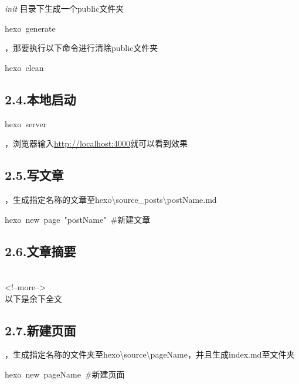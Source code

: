 \documentclass{article}
\begin{document}
 \emph{init} 目录下生成一个public文件夹%
\begin{mdpre}%
\noindent hexo~generate%
\end{mdpre}，那要执行以下命令进行清除public文件夹
\begin{mdpre}%
\noindent hexo~clean\\
\end{mdpre}
\subsection{2.4.\hspace*{0.5em}本地启动}\label{section}%
\begin{mdpre}%
\noindent hexo~server\\
\end{mdpre}，浏览器输入\href{http://localhost:4000}{http://localhost:4000}就可以看到效果

\subsection{2.5.\hspace*{0.5em}写文章}\label{section}%

，生成指定名称的文章至hexo\textbackslash{}source\_posts\textbackslash{}postName.md%
\begin{mdpre}%
\noindent hexo~new~page~"postName"~\#新建文章~~~~%
\end{mdpre}
\subsection{2.6.\hspace*{0.5em}文章摘要}\label{section}%

\begin{mdpre}%
\\
\textless{}!--more--\textgreater{}\\
以下是余下全文\\
\end{mdpre}
\subsection{2.7.\hspace*{0.5em}新建页面}\label{section}%

，生成指定名称的文件夹至hexo\textbackslash{}source\textbackslash{}pageName，并且生成index.md至文件夹%
\begin{mdpre}%
\noindent hexo~new~pageName~\#新建页面\\
\end{mdpre}
\end{document}

